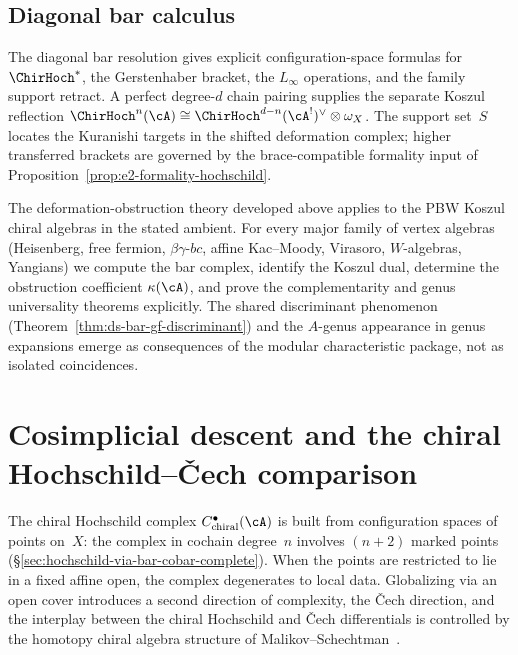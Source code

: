 \subsection{Diagonal bar calculus}

The diagonal bar resolution gives explicit configuration-space
formulas for $\ChirHoch^*$, the Gerstenhaber bracket, the
$L_\infty$ operations, and the family support retract.  A perfect
degree-$d$ chain pairing supplies the separate Koszul reflection
$\ChirHoch^n(\cA)\cong
\ChirHoch^{d-n}(\cA^!)^\vee\otimes\omega_X$.  The support set~$S$
locates the Kuranishi targets in the shifted deformation complex;
higher transferred brackets are governed by the brace-compatible
formality input of Proposition~\ref{prop:e2-formality-hochschild}.

\medskip

The deformation-obstruction theory developed above applies to the
PBW Koszul chiral algebras in the stated ambient. For every
major family of vertex algebras (Heisenberg, free fermion, $\beta\gamma$-$bc$,
affine Kac--Moody, Virasoro, $W$-algebras, Yangians) we compute the bar
complex, identify the Koszul dual, determine the obstruction coefficient
$\kappa(\cA)$, and prove the complementarity and genus universality theorems
explicitly. The shared discriminant phenomenon
(Theorem~\ref{thm:ds-bar-gf-discriminant}) and the $\hat{A}$-genus appearance
in genus expansions emerge as consequences of the modular characteristic
package, not as isolated coincidences.


\section{Cosimplicial descent and the chiral Hochschild--\v{C}ech comparison}
\label{sec:cosimplicial-hochschild}

The chiral Hochschild complex $C^\bullet_{\mathrm{chiral}}(\cA)$
is built from configuration spaces of points on~$X$: the complex
in cochain degree~$n$ involves $(n+2)$ marked points
(\S\ref{sec:hochschild-via-bar-cobar-complete}). When the points are
restricted to lie in a fixed affine open, the complex degenerates
to local data. Globalizing via an open cover introduces a second
direction of complexity, the \v{C}ech direction, and the
interplay between the chiral Hochschild and \v{C}ech differentials is
controlled by the homotopy chiral algebra structure of
Malikov--Schechtman~\cite{MS24}.

